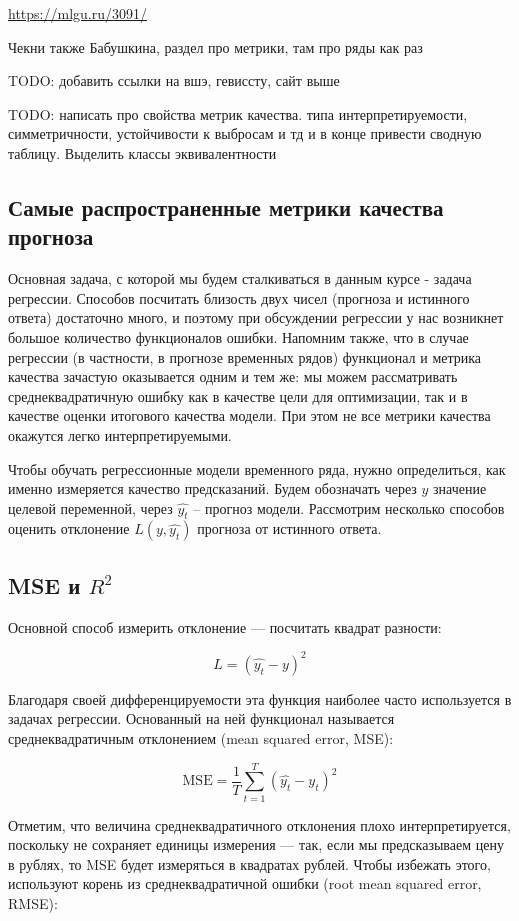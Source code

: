 \url{https://mlgu.ru/3091/}

Чекни также Бабушкина, раздел про метрики, там про ряды как раз

TODO: добавить ссылки на вшэ, гевиссту, сайт выше

TODO: написать про свойства метрик качества. типа интерпретируемости,
симметричности, устойчивости к выбросам и тд и в конце привести
сводную таблицу. Выделить классы эквивалентности

\subsection{Самые распространенные метрики качества прогноза}

Основная задача, с которой мы будем сталкиваться в данным курсе -
задача регрессии. Способов посчитать близость двух чисел
(прогноза и истинного ответа) достаточно много, и поэтому при
обсуждении регрессии у нас возникнет большое количество функционалов ошибки.
Напомним также, что в случае регрессии (в частности, в прогнозе
временных рядов) функционал и метрика качества
зачастую оказывается одним и тем же: мы можем рассматривать
среднеквадратичную ошибку как в качестве цели для оптимизации, так
и в качестве оценки итогового качества модели. При этом не все
метрики качества окажутся легко интерпретируемыми.

Чтобы обучать регрессионные модели временного ряда, нужно
определиться, как именно измеряется качество предсказаний. Будем
обозначать через \( y \) значение целевой переменной, через \( \hat{y_t} \) --
прогноз модели.
Рассмотрим несколько способов оценить отклонение \( L(y, \hat{y_t}) \)
прогноза от истинного ответа.

\subsection*{MSE и \( R^2 \)}
Основной способ измерить отклонение — посчитать квадрат разности:

\[ L = (\hat{y_t} - y)^2 \]

Благодаря своей дифференцируемости эта функция наиболее часто
используется в задачах регрессии. Основанный на ней функционал
называется среднеквадратичным отклонением (mean squared error, MSE):

\[ \text{MSE} = \frac{1}{T} \sum_{t=1}^{T} (\hat{y_t} - y_t)^2 \]

Отметим, что величина среднеквадратичного отклонения плохо
интерпретируется, поскольку не сохраняет единицы измерения — так,
если мы предсказываем цену в рублях, то MSE будет измеряться в
квадратах рублей. Чтобы избежать этого, используют корень из
среднеквадратичной ошибки (root mean squared error, RMSE):

